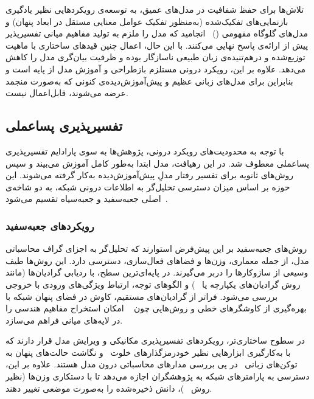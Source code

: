 تلاش‌ها برای حفظ شفافیت در مدل‌های عمیق، به توسعه‌ی رویکردهایی نظیر یادگیری بازنمایی‌های تفکیک‌شده (به‌منظور تفکیک عوامل معنایی مستقل در ابعاد پنهان) و مدل‌های گلوگاه مفهومی ()~\cite{koh2020cbm} انجامید که مدل را ملزم به تولید مفاهیم میانی تفسیرپذیر پیش از ارائه‌ی پاسخ نهایی می‌کنند. با این حال، اعمال چنین قیدهای ساختاری با ماهیت توزیع‌شده و درهم‌تنیده‌ی زبان طبیعی ناسازگار بوده و ظرفیت بیان‌گری مدل را کاهش می‌دهد. علاوه بر این، رویکرد درونی مستلزم بازطراحی و آموزش مدل از پایه است و بنابراین برای مدل‌های زبانی عظیم و پیش‌آموزش‌دیده‌ی کنونی که به‌صورت منجمد عرضه می‌شوند، قابل‌اعمال نیست.

\subsection{تفسیرپذیری پساعملی}\label{sec:1-3-2}

با توجه به محدودیت‌های رویکرد درونی، پژوهش‌ها به سوی پارادایم تفسیرپذیری پساعملی معطوف شد. در این رهیافت، مدل ابتدا به‌طور کامل آموزش می‌بیند و سپس روش‌های ثانویه برای تفسیر رفتار مدلِ پیش‌آموزش‌دیده به‌کار گرفته می‌شوند. این حوزه بر اساس میزان دسترسی تحلیل‌گر به اطلاعات درونی شبکه، به دو شاخه‌ی اصلی جعبه‌سفید و جعبه‌سیاه تقسیم می‌شود~\cite{guidotti2018survey, danilevsky2020survey}.


\subsubsection{رویکردهای جعبه‌سفید}\label{sec:1-3-2-1}

روش‌های جعبه‌سفید بر این پیش‌فرض استوارند که تحلیل‌گر به اجزای گراف محاسباتی مدل، از جمله معماری، وزن‌ها و فضاهای فعال‌سازی، دسترسی دارد. این روش‌ها طیف وسیعی از سازوکارها را دربر می‌گیرند. در پایه‌ای‌ترین سطح، با ردیابی گرادیان‌ها (مانند روش گرادیان‌های یکپارچه یا ~\cite{sundararajan2017axiomatic}) و الگوهای توجه، ارتباط ویژگی‌های ورودی با خروجی بررسی می‌شود. فراتر از گرادیان‌های مستقیم، کاوش در فضای پنهان شبکه با بهره‌گیری از کاوشگرهای خطی و روش‌هایی چون ~\cite{kim2018interpretability} امکان استخراج مفاهیم هندسی را در لایه‌های میانی فراهم می‌سازد.

در سطوح ساختاری‌تر، رویکردهای تفسیرپذیری مکانیکی و ویرایش مدل قرار دارند که با به‌کارگیری ابزارهایی نظیر خودرمزگذارهای خلوت~\cite{elhage2021mathematical} و نگاشت حالت‌های پنهان به توکن‌های زبانی~\cite{ghandeharioun2024patchscopes} در پی بررسی مدارهای محاسباتی درون مدل هستند. علاوه بر این، دسترسی به پارامترهای شبکه به پژوهشگران اجازه می‌دهد تا با دستکاری وزن‌ها (نظیر روش ~\cite{meng2022locating})، دانش ذخیره‌شده را به‌صورت موضعی تغییر دهند.

